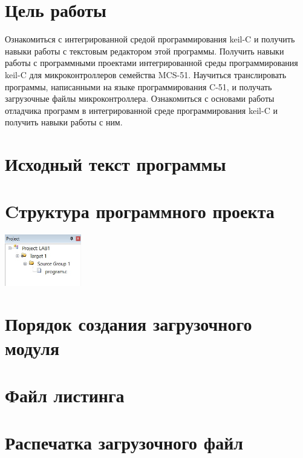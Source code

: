 \documentclass[ru, listings]{labreport}
\begin{document}
\maketitlepage

\section*{Цель работы}

Ознакомиться с интегрированной средой программирования keil-C и получить навыки работы
с текстовым редактором этой программы. Получить навыки работы с программными проектами
интегрированной среды программирования keil-C для микроконтроллеров семейства MCS-51.
Научиться транслировать программы, написанными на языке программирования C-51,
и получать загрузочные файлы микроконтроллера.
Ознакомиться с основами работы отладчика программ в
интегрированной среде программирования keil-C и получить навыки работы с ним.

\section*{Исходный текст программы}



\section*{Cтруктура программного проекта}

\includegraphics[width=0.25\textwidth]{project-structure}

\section*{Порядок создания загрузочного модуля}

\section*{Файл листинга}



\section*{Распечатка загрузочного файл}
\end{document}
